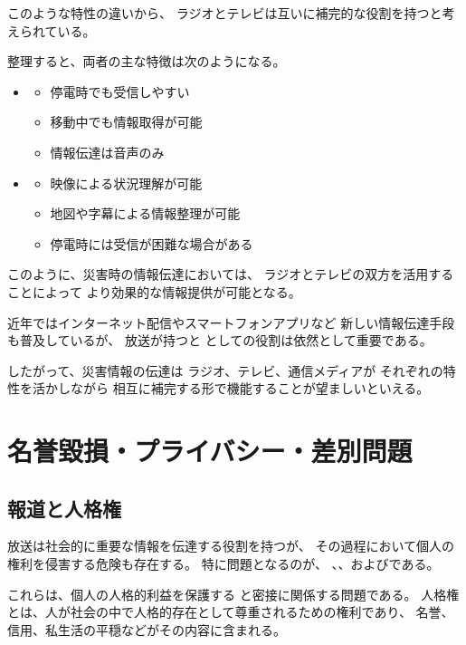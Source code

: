 このような特性の違いから、
ラジオとテレビは互いに補完的な役割を持つと考えられている。

整理すると、両者の主な特徴は次のようになる。

\begin{itemize}
  \item {}
  \begin{itemize}
    \item 停電時でも受信しやすい
    \item 移動中でも情報取得が可能
    \item 情報伝達は音声のみ
  \end{itemize}

  \item {}
  \begin{itemize}
    \item 映像による状況理解が可能
    \item 地図や字幕による情報整理が可能
    \item 停電時には受信が困難な場合がある
  \end{itemize}
\end{itemize}

このように、災害時の情報伝達においては、
ラジオとテレビの双方を活用することによって
より効果的な情報提供が可能となる。

近年ではインターネット配信やスマートフォンアプリなど
新しい情報伝達手段も普及しているが、
放送が持つと
としての役割は依然として重要である。

したがって、災害情報の伝達は
ラジオ、テレビ、通信メディアが
それぞれの特性を活かしながら
相互に補完する形で機能することが望ましいといえる。


\section{名誉毀損・プライバシー・差別問題}

\subsection{報道と人格権}

放送は社会的に重要な情報を伝達する役割を持つが、
その過程において個人の権利を侵害する危険も存在する。
特に問題となるのが、
、、およびである。

これらは、個人の人格的利益を保護する
と密接に関係する問題である。
人格権とは、人が社会の中で人格的存在として尊重されるための権利であり、
名誉、信用、私生活の平穏などがその内容に含まれる。

